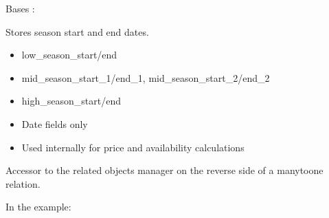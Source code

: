 \documentclass[letterpaper,10pt,french]{sphinxmanual}
\begin{document}

\begin{fulllineitems}
\label{\detokenize{index:bookings.models.SeasonInfo}}
\pysigstartsignatures
\pysiglinewithargsret
{}
{\sphinxparamcomma {}}
{}
\pysigstopsignatures
\sphinxAtStartPar
Bases : 

\sphinxAtStartPar
Stores season start and end dates.
\begin{description}
\begin{itemize}
\item {} 
\sphinxAtStartPar
low\_season\_start/end

\item {} 
\sphinxAtStartPar
mid\_season\_start\_1/end\_1, mid\_season\_start\_2/end\_2

\item {} 
\sphinxAtStartPar
high\_season\_start/end

\end{itemize}

\begin{itemize}
\item {} 
\sphinxAtStartPar
Date fields only

\item {} 
\sphinxAtStartPar
Used internally for price and availability calculations

\end{itemize}

\end{description}

\begin{fulllineitems}
\label{\detokenize{index:bookings.models.SeasonInfo.translations}}
\pysigstartsignatures
\pysigline
{}
\pysigstopsignatures
\sphinxAtStartPar
Accessor to the related objects manager on the reverse side of a
many\sphinxhyphen{}to\sphinxhyphen{}one relation.

\sphinxAtStartPar
In the example:


\end{fulllineitems}
\end{fulllineitems}
\end{document}
